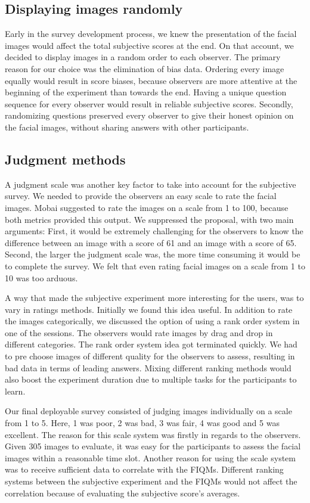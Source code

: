 \newpage 

\subsection*{Displaying images randomly}
Early in the survey development process, we knew the presentation of the facial images would affect the total subjective scores at the end. On that account, we decided to display images in a random order to each observer. The primary reason for our choice was the elimination of bias data. Ordering every image equally would result in score biases, because observers are more attentive at the beginning of the experiment than towards the end. Having a unique question sequence for every observer would result in reliable subjective scores. 
Secondly, randomizing questions preserved every observer to give their honest opinion on the facial images, without sharing answers with other participants.

\subsection*{Judgment methods}
A judgment scale was another key factor to take into account for the subjective survey. We needed to provide the observers an easy scale to rate the facial images. Mobai suggested to rate the images on a scale from 1 to 100, because both metrics provided this output. We suppressed the proposal, with two main arguments: First, it would be extremely challenging for the observers to know the difference between an image with a score of 61 and an image with a score of 65. Second, the larger the judgment scale was, the more time consuming it would be to complete the survey. We felt that even rating facial images on a scale from 1 to 10 was too arduous. 

A way that made the subjective experiment more interesting for the users, was to vary in ratings methods. Initially we found this idea useful. In addition to rate the images categorically, we discussed the option of using a rank order system in one of the sessions. The observers would rate images by drag and drop in different categories. The rank order system idea got terminated quickly. We had to pre choose images of different quality for the observers to assess, resulting in bad data in terms of leading answers. Mixing different ranking methods would also boost the experiment duration due to multiple tasks for the participants to learn. 

Our final deployable survey consisted of judging images individually on a scale from 1 to 5. Here, 1 was poor, 2 was bad, 3 was fair, 4 was good and 5 was excellent. The reason for this scale system was firstly in regards to the observers. Given 305 images to evaluate, it was easy for the participants to assess the facial images within a reasonable time slot. Another reason for using the scale system was to receive sufficient data to correlate with the FIQMs. Different ranking systems between the subjective experiment and the FIQMs would not affect the correlation because of evaluating the subjective score's averages.

